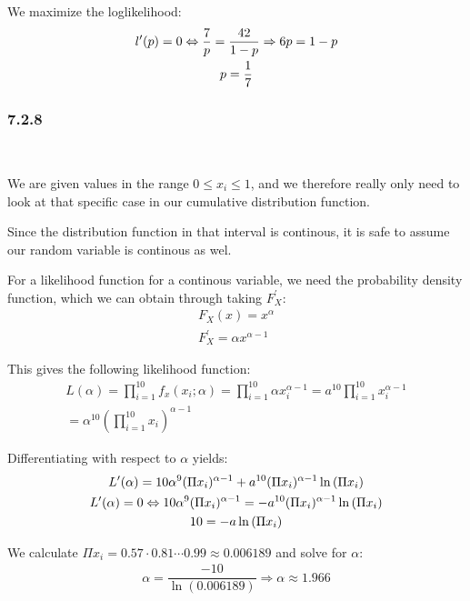 \noindent We maximize the loglikelihood:
\begin{equation*}
  \begin{gathered}
    l^{\prime}(p) = 0 \Leftrightarrow \dfrac{7}{p} = \dfrac{42}{1-p} \Rightarrow 6p = 1-p\\
    p = \dfrac{1}{7}
  \end{gathered}
\end{equation*}
\par\bigskip
\subsubsection{7.2.8}\hfill\\\par
\noindent We are given values in the range $0\leq x_i\leq 1$, and we therefore really only need to look at that specific case in our cumulative distribution function.\par
\noindent Since the distribution function in that interval is continous, it is safe to assume our random variable is continous as wel.\par
\noindent For a likelihood function for a continous variable, we need the probability density function, which we can obtain through taking $F_X^{\prime}$:
\begin{equation*}
  \begin{gathered}
    F_X(x) = x^\alpha\\
    F_X^{\prime} = \alpha x^{\alpha-1}
  \end{gathered}
\end{equation*}\par
\noindent This gives the following likelihood function:
\begin{equation*}
  \begin{gathered}
    L(\alpha) = \prod_{i=1}^{10}f_x(x_i;\alpha) = \prod_{i=1}^{10}\alpha x_i^{\alpha-1} = a^{10}\prod_{i=1}^{10}x_i^{\alpha-1}\\
    = \alpha^{10}\left(\prod_{i=1}^{10}x_i\right)^{\alpha-1}
  \end{gathered}
\end{equation*}\par
\noindent Differentiating with respect to $\alpha$ yields:
\begin{equation*}
  \begin{gathered}
    L^{\prime}(\alpha) = 10\alpha^9(\Pi x_i)^{\alpha-1}+a^{10}(\Pi x_i)^{\alpha-1}\ln{\left(\Pi x_i\right)}\\
    L^{\prime}(\alpha) = 0\Leftrightarrow 10\alpha^9(\Pi x_i)^{\alpha-1}=-a^{10}(\Pi x_i)^{\alpha-1}\ln{\left(\Pi x_i\right)}\\
    10 = -a\ln{\left(\Pi x_i\right)}
  \end{gathered}
\end{equation*}\par
\noindent We calculate $\Pi x_i = 0.57\cdot0.81\cdots0.99\approx 0.006189$ and solve for $\alpha$:
\begin{equation*}
  \begin{gathered}
    \alpha = \dfrac{-10}{\ln{\left(0.006189\right)}} \Rightarrow \alpha\approx 1.966
  \end{gathered}
\end{equation*}
\par\bigskip
